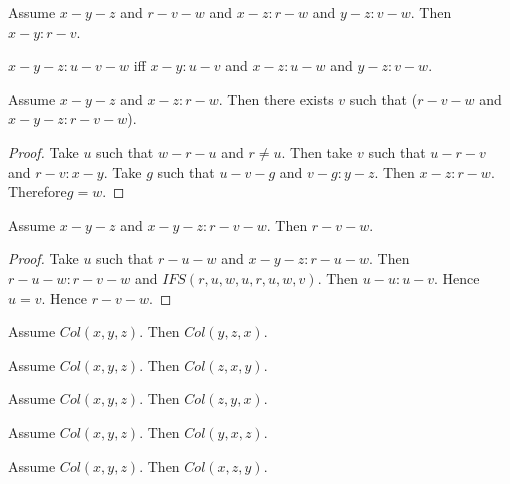 \documentclass{article}
\begin{document}
  \begin{forthel}
    \begin{axiom}[L4o3]
      Assume $x-y-z$ and $r-v-w$ and $x-z : r-w$ and $y-z : v-w$. Then $x-y : r-v$.
    \end{axiom}

    \begin{definition}[L4o4]
      $x-y-z : u-v-w$ iff $x-y : u-v$ and $x-z : u-w$ and $y-z : v-w$.
    \end{definition}

    \begin{lemma}[L4o5]
      Assume $x-y-z$ and $x-z : r-w$. Then there exists $v$ such that ($r-v-w$ and $x-y-z : r-v-w$).
    \end{lemma}
    \begin{proof}
    	Take $u$ such that $w-r-u$ and $r \neq u$. Then take $v$ such that $u-r-v$ and $r-v : x-y$. Take $g$ such that $u-v-g$ and $v-g : y-z$. Then $x-z : r-w$. Therefore$ g = w$.
    \end{proof}

    \begin{lemma}[L4o6]
      Assume $x-y-z$ and $x-y-z : r-v-w$. Then $r-v-w$.
    \end{lemma}
    \begin{proof}
    	Take $u$ such that $r-u-w$ and $x-y-z : r-u-w$.	Then $r-u-w : r-v-w$ and $IFS(r,u,w,u,r,u,w,v)$.	Then $u-u : u-v$. Hence $u = v$. Hence $r-v-w$.
    \end{proof}

    \begin{lemma}[L4o11a]
      Assume $Col(x,y,z)$. Then $Col(y,z,x)$.
    \end{lemma}

    \begin{lemma}[L4o11b]
      Assume $Col(x,y,z)$. Then $Col(z,x,y)$.
    \end{lemma}

    \begin{lemma}[L4o11c]
      Assume $Col(x,y,z)$. Then $Col(z,y,x)$.
    \end{lemma}

    \begin{lemma}[L4o11d]
      Assume $Col(x,y,z)$. Then $Col(y,x,z)$.
    \end{lemma}

    \begin{lemma}[L4o11e]
      Assume $Col(x,y,z)$. Then $Col(x,z,y)$.
    \end{lemma}


\end{forthel}
\end{document}
